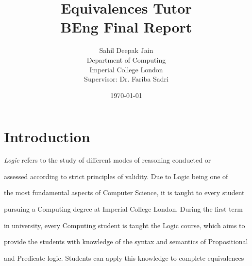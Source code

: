 \documentclass[12pt]{article}
\begin{document}
\title{Equivalences Tutor\\BEng Final Report}



\author{Sahil Deepak Jain\\Department of Computing\\Imperial College London\\Supervisor: Dr. Fariba Sadri}

\date{\today}



\maketitle

\newpage




\begin{abstract}



\end{abstract}

\newpage




\tableofcontents



\newpage




\section{Introduction}



\emph{Logic} refers to the study of different modes of reasoning conducted or 

assessed according to strict principles of validity. Due to Logic being one of 

the most fundamental aspects of Computer Science, it is taught to every student

pursuing a Computing degree at Imperial College London. During the first term 

in university, every Computing student is taught the Logic course, which aims to

provide the students with knowledge of the syntax and semantics of Propositional 

and Predicate logic. Students can apply this knowledge to complete equivalences
\end{document}
